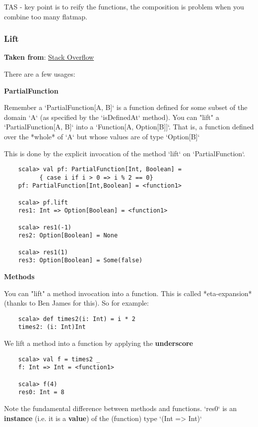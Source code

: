 \documentclass{article}
\begin{document}
TAS - key point is to reify the functions, the composition is problem when you combine too many flatmap.

\subsubsection{Lift}

\textbf{Taken from}: \href{http://stackoverflow.com/questions/17965059/what-is-lifting-in-scala}{Stack Overflow}

There are a few usages:

\textbf{PartialFunction}


Remember a `PartialFunction[A, B]` is a function defined for some subset of the domain `A` (as specified by the `isDefinedAt` method). You can "lift" a `PartialFunction[A, B]` into a `Function[A, Option[B]]`. That is, a function defined over the *whole* of `A` but whose values are of type `Option[B]`

This is done by the explicit invocation of the method `lift` on `PartialFunction`.

\begin{verbatim}
    scala> val pf: PartialFunction[Int, Boolean] = 
          { case i if i > 0 => i % 2 == 0}
    pf: PartialFunction[Int,Boolean] = <function1>

    scala> pf.lift
    res1: Int => Option[Boolean] = <function1>

    scala> res1(-1)
    res2: Option[Boolean] = None

    scala> res1(1)
    res3: Option[Boolean] = Some(false)
\end{verbatim}

\textbf{Methods}

You can "lift" a method invocation into a function. This is called *eta-expansion* (thanks to Ben James for this). So for example:

\begin{verbatim}
    scala> def times2(i: Int) = i * 2
    times2: (i: Int)Int
\end{verbatim}

We lift a method into a function by applying the \textbf{underscore}

\begin{verbatim}
    scala> val f = times2 _
    f: Int => Int = <function1>

    scala> f(4)
    res0: Int = 8
\end{verbatim}

Note the fundamental difference between methods and functions. `res0` is an \textbf{instance} (i.e. it is a \textbf{value}) of the (function) type `(Int => Int)`
\end{document}
